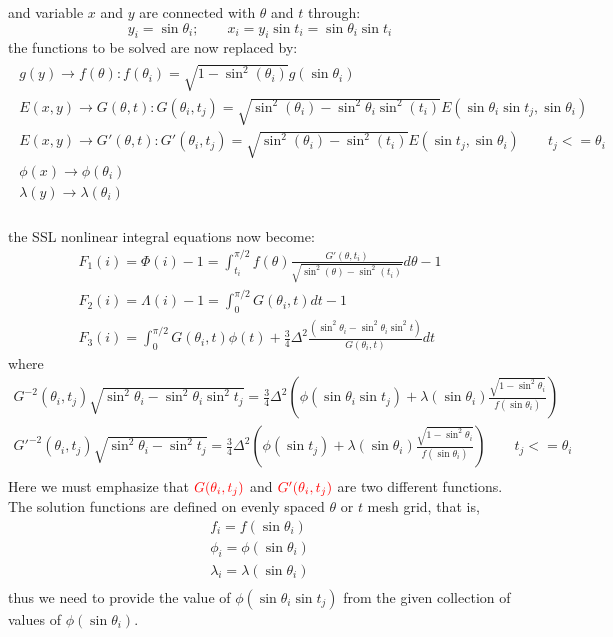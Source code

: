 \documentclass{article}
\begin{document}
and variable $x$ and $y$ are connected with $\theta$ and $t$ through:
\begin{equation}
 y_i=\sin \theta_i ; \qquad  x_i=y_i\sin t_i=\sin\theta_i\sin t_i
\end{equation}
the functions to be solved are now replaced by:
\begin{eqnarray}
\begin{align*}
 g(y)   \rightarrow  f(\theta) : f(\theta_i)=\sqrt{1-\sin^2(\theta_i)}g(\sin\theta_i) \\
  E(x,y) \rightarrow G(\theta,t) : G(\theta_i,t_j)=\sqrt{\sin^2(\theta_i)-\sin^2\theta_i\sin^2(t_i)}E(\sin\theta_i\sin t_j,\sin\theta_i) \\
  E(x,y) \rightarrow G'(\theta,t) : G'(\theta_i,t_j)=\sqrt{\sin^2(\theta_i)-\sin^2(t_i)}E(\sin t_j,\sin\theta_i) \qquad t_j<=\theta_i \\
  \phi(x) \rightarrow \phi(\theta_i) \\
  \lambda(y) \rightarrow \lambda(\theta_i) \\
 \end{align*}
\end{eqnarray}

the SSL nonlinear integral equations now become:
\begin{eqnarray}
 F_1(i)=\Phi(i)-1=\int^{\pi/2}_{t_i}f(\theta)\frac{G'(\theta,t_i)}{\sqrt{\sin^2(\theta)-\sin^2(t_i)}}d\theta-1\\
 F_2(i)=\Lambda(i)-1=\int^{\pi/2}_{0}G(\theta_i,t)dt-1\\
 F_3(i)=\int^{\pi/2}_{0}G(\theta_i,t)\phi(t)+\frac{3}{4}\Delta^2 \frac{(\sin^2\theta_i-\sin^2\theta_i\sin^2t)}{G(\theta_i,t)}dt
\end{eqnarray}
where 
\begin{eqnarray}
 G^{-2}(\theta_i,t_j)\sqrt{\sin^2\theta_i-\sin^2\theta_i\sin^2t_j}=\frac{3}{4}\Delta^2(\phi(\sin\theta_i\sin t_j) +\lambda(\sin\theta_i)\frac{\sqrt{1-\sin^2\theta_i}}{f(\sin\theta_i)})\\
 G'^{-2}(\theta_i,t_j)\sqrt{\sin^2\theta_i-\sin^2t_j}=\frac{3}{4}\Delta^2(\phi(\sin t_j) +\lambda(\sin\theta_i)\frac{\sqrt{1-\sin^2\theta_i}}{f(\sin\theta_i)}) \qquad t_j<=\theta_i\\
\end{eqnarray}
Here we must emphasize that $\textcolor{red}{G(\theta_i,t_j)}$ and $\textcolor{red}{G'(\theta_i,t_j)}$ are two different functions.
The solution functions are defined on evenly spaced $\theta$ or $t$ mesh grid, that is,
\begin{eqnarray}
 f_i=f(\sin\theta_i) \\
 \phi_i=\phi(\sin\theta_i)\\
 \lambda_i=\lambda(\sin\theta_i)\\
\end{eqnarray}
thus we need to provide the value of $\phi(\sin\theta_i\sin t_j)$ from the given collection of values of $\phi(\sin\theta_i)$.
\end{document}
